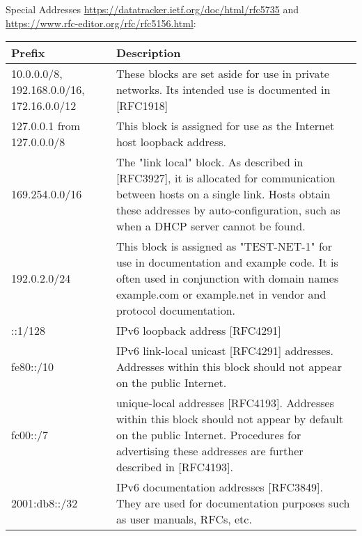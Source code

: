 \documentclass[a4paper,11pt,notitlepage,landscape]{report}
\begin{document}
Special Addresses \url{https://datatracker.ietf.org/doc/html/rfc5735} and \url{https://www.rfc-editor.org/rfc/rfc5156.html}:\\
\begin{tabularx}{\textwidth-2cm}{|p{3cm}|X|} \hline
{\bf Prefix } & {\bf Description}\\\hline
   10.0.0.0/8, 192.168.0.0/16, 172.16.0.0/12   & These blocks are set aside for use in private networks.
   Its intended use is documented in [RFC1918] \\\hline

127.0.0.1 from 127.0.0.0/8 & This block is assigned for use as the Internet host loopback address. \\\hline

169.254.0.0/16 & The "link local" block.  As described in
   [RFC3927], it is allocated for communication between hosts on a
   single link.  Hosts obtain these addresses by auto-configuration,
   such as when a DHCP server cannot be found. \\\hline
192.0.2.0/24 & This block is assigned as "TEST-NET-1" for use in
   documentation and example code.  It is often used in conjunction with
   domain names example.com or example.net in vendor and protocol
   documentation. \\\hline
::1/128 & IPv6 loopback address [RFC4291] \\\hline
 fe80::/10 & IPv6 link-local unicast [RFC4291] addresses.  Addresses
   within this block should not appear on the public Internet. \\\hline
fc00::/7 & unique-local addresses [RFC4193].  Addresses within
   this block should not appear by default on the public Internet.
   Procedures for advertising these addresses are further described in
   [RFC4193].  \\\hline
   2001:db8::/32 & IPv6 documentation addresses [RFC3849].  They
   are used for documentation purposes such as user manuals, RFCs, etc. \\\hline
\end{tabularx}
\end{document}
